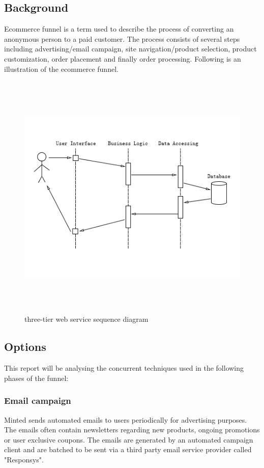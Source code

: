 \documentclass[12pt]{article}
\begin{document}
\subsection{Background}
Ecommerce funnel is a term used to describe the process of converting an anonymous person to a paid customer. The process consists of several steps including advertising/email campaign, site navigation/product selection, product customization, order placement and finally order processing. Following is an illustration of the ecommerce funnel.
\begin{figure}[ht!]
\centering
\includegraphics[width=12cm,height=12cm,keepaspectratio]{img/three_tier.jpg}
\caption{three-tier web service sequence diagram}
\label{overflow}
\end{figure}


\subsection{Options}
This report will be analysing the concurrent techniques used in the following phases of the funnel:
\subsubsection{Email campaign}
Minted sends automated emails to users periodically for advertising purposes. The emails often contain newsletters regarding new products, ongoing promotions or user exclusive coupons. The emails are generated by an automated campaign client and are batched to be sent via a third party email service provider called "Responsys".\\
		
\end{document}
